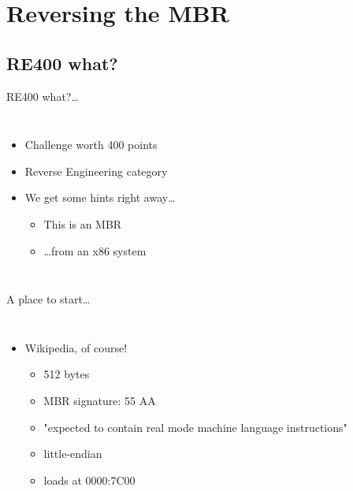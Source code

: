 
\section{Reversing the MBR}

\subsection{RE400 what?}

\begin{frame}{RE400 what?\ldots}
    \begin{columns}
	        \begin{itemize}
                \item Challenge worth 400 points
                \item Reverse Engineering category
                \item We get some hints right away\ldots
                \begin{itemize}
                	\item This is an MBR
                	\item \ldots from an x86 system
        	    \end{itemize}
            \end{itemize}
                {}
    \end{columns}
\end{frame}

\begin{frame}{A place to start\ldots}
    \begin{columns}
	        \begin{itemize}
                \item<1-> Wikipedia, of course!
		        \begin{itemize}
    	            \item<2-> 512 bytes
        	        \item<2-> MBR signature: 55 AA
            	    \item<2-> "expected to contain real mode machine language instructions"
                	\item<2-> little-endian
                	\item<2-> loads at 0000:7C00
	            \end{itemize}                	
            \end{itemize}
                {}
    \end{columns}
\end{frame}

